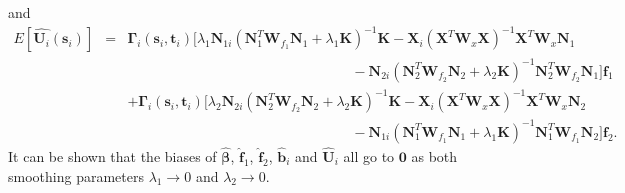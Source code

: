 \documentclass[article,lineno]{biometrika}
\begin{document}
and
 \begin{eqnarray*}
E\left[
\hat {\boldsymbol U_i}(\boldsymbol s_i) 
\right] 
&=& 
\boldsymbol \Gamma_i(\boldsymbol s_i, \boldsymbol t_i) 
[
\lambda_1 \boldsymbol N_{1i}
 (\boldsymbol N_1^T \boldsymbol W_{f_1}  \boldsymbol N_1 + \lambda_1 \boldsymbol K)^{-1}  
\boldsymbol K
-  
\boldsymbol X_i(\boldsymbol X^T  \boldsymbol W_x \boldsymbol X )^{-1} \boldsymbol X^T  \boldsymbol W_x  \boldsymbol N_1
\\
&&
\quad\quad \quad \quad \quad \quad \quad\quad \quad \quad \quad \quad\quad \quad\quad\quad
-
 \boldsymbol N_{2i}
(\boldsymbol N_2^T \boldsymbol W_{f_2}  \boldsymbol N_2 + \lambda_2 \boldsymbol K)^{-1}  \boldsymbol N_2^T \boldsymbol W_{f_2} 
\boldsymbol N_{1} 
 ]
  \boldsymbol f_1  
\\
&&
+
\boldsymbol \Gamma_i(\boldsymbol s_i, \boldsymbol t_i) 
[
\lambda_2 \boldsymbol N_{2i}
(\boldsymbol N_2^T \boldsymbol W_{f_2}  \boldsymbol N_2 + \lambda_2 \boldsymbol K)^{-1}
  \boldsymbol K
-  
\boldsymbol X_i(\boldsymbol X^T  \boldsymbol W_x \boldsymbol X )^{-1} \boldsymbol X^T  \boldsymbol W_x  \boldsymbol N_2
\\
&& 
\quad \quad \quad \quad \quad \quad \quad \quad \quad \quad \quad\quad\quad\quad\quad\quad
-
 \boldsymbol N_{1i}
 (\boldsymbol N_1^T \boldsymbol W_{f_1}  \boldsymbol N_1 + \lambda_1 \boldsymbol K)^{-1}  
\boldsymbol N_1^T \boldsymbol W_{f_1}
\boldsymbol N_2
 ]
  \boldsymbol f_2.
  \end{eqnarray*}
It can be shown that the biases of $\boldsymbol {\hat \beta}$, $\boldsymbol {\hat f}_1$, $\boldsymbol {\hat f}_2$, $\boldsymbol {\hat b}_i$ and $\boldsymbol {\hat U}_i$ all go to $\boldsymbol 0$ as both smoothing parameters $\lambda_1 \to 0$ and $\lambda_2 \to 0$.
\end{document}
